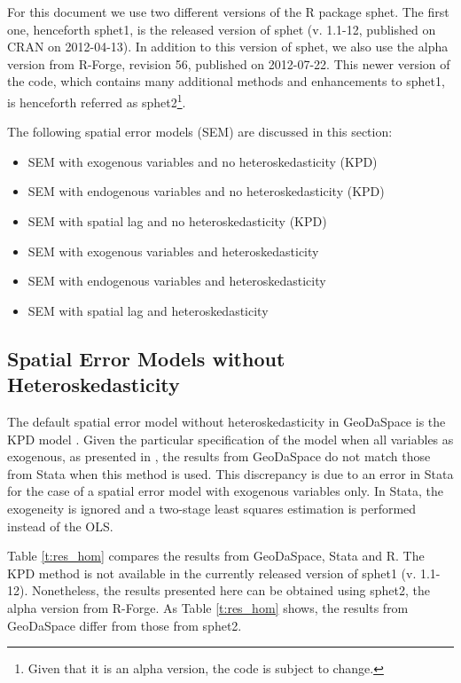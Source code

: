 \documentclass{article}
\begin{document}
For this document we use two different versions of the R package sphet. The first one, henceforth sphet1, is the released version of sphet (v. 1.1-12, published on CRAN on 2012-04-13). In addition to this version of sphet, we also use the alpha version from R-Forge, revision 56, published on 2012-07-22. This newer version of the code, which contains many additional methods and enhancements to sphet1, is henceforth referred as sphet2\footnote{Given that it is an alpha version, the code is subject to change.}.


The following spatial error models (SEM) are discussed in this section:

\begin{itemize}
\item SEM with exogenous variables and no heteroskedasticity (KPD)
\item SEM with endogenous variables and no heteroskedasticity (KPD)
\item SEM with spatial lag and no heteroskedasticity (KPD)
\item SEM with exogenous variables and heteroskedasticity
\item SEM with endogenous variables and heteroskedasticity
\item SEM with spatial lag and heteroskedasticity
\end{itemize}

\subsection{Spatial Error Models without Heteroskedasticity}

The default spatial error model without heteroskedasticity in GeoDaSpace is the KPD model \citep{Drukker10}. Given the particular specification of the model when all variables as exogenous, as presented in \citet{Anselin11}, the results from GeoDaSpace do not match those from Stata when this method is used. This discrepancy is due to an error in Stata for the case of a spatial error model with exogenous variables only. In Stata, the exogeneity is ignored and a two-stage least squares estimation is performed instead of the OLS.

Table \ref{t:res_hom} compares the results from GeoDaSpace, Stata and R. The KPD method is not available in the currently released version of sphet1 (v. 1.1-12). Nonetheless, the results presented here can be obtained using sphet2, the alpha version from R-Forge. As Table \ref{t:res_hom} shows, the results from GeoDaSpace differ from those from sphet2. 
\end{document}
